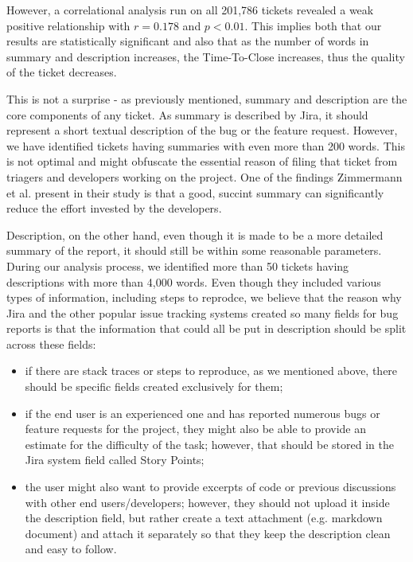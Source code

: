 \documentclass{mpaper}
\begin{document}
However, a correlational analysis run on all 201,786 tickets revealed a weak positive relationship with $r = 0.178$ and $p < 0.01$. 
This implies both that our results are statistically significant and also that as the number of words in summary and description increases, 
the Time-To-Close increases, thus the quality of the ticket decreases.

This is not a surprise - as previously mentioned, summary and description are the core components of any ticket. 
As summary is described by Jira, it should represent a short textual description of the bug or the feature request. However,
we have identified tickets having summaries with even more than 200 words. This is not optimal and might obfuscate
the essential reason of filing that ticket from triagers and developers working on the project. One of the findings 
Zimmermann et al. \cite{zimmermann2010makes} present in their study is that a good, succint summary can significantly 
reduce the effort invested by the developers. 

Description, on the other hand, even though it is made to be a more detailed summary of the report, it should still be
within some reasonable parameters. During our analysis process, we identified more than 50 tickets having descriptions 
with more than 4,000 words. Even though they included various types of information, including steps to reprodce, 
we believe that the reason why Jira and the other popular issue tracking systems created so many fields for bug reports 
is that the information that could all be put in description should be split across these fields: 
\begin{itemize}
  \item if there are stack traces or steps to reproduce, as we mentioned above, there should be specific fields 
  created exclusively for them; 
  \item if the end user is an experienced one and has reported numerous bugs or feature requests for the project, 
  they might also be able to provide an estimate for the difficulty of the task; however, that should be stored in the 
  Jira system field called Story Points;
  \item the user might also want to provide excerpts of code or previous discussions with other end users/developers; 
  however, they should not upload it inside the description field, but rather create a text attachment (e.g. markdown
  document) and attach it separately so that they keep the description clean and easy to follow.
\end{itemize}
\end{document}

